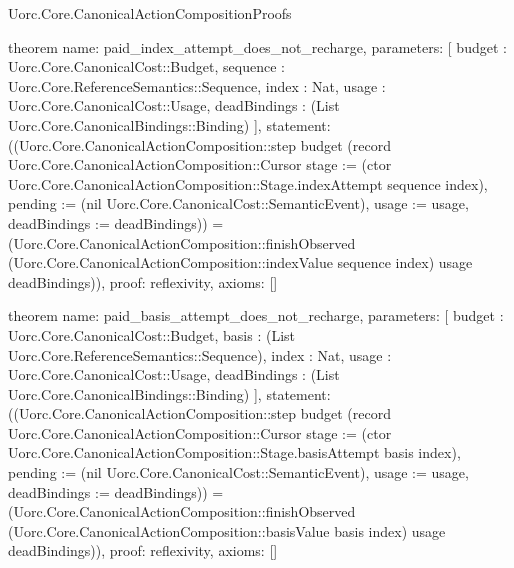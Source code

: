 \begin{lexlean}{Uorc.Core.CanonicalActionCompositionProofs}
\begin{semanticmodule}
theorem{
  name: paid_index_attempt_does_not_recharge,
  parameters: [
    budget : Uorc.Core.CanonicalCost::Budget,
    sequence : Uorc.Core.ReferenceSemantics::Sequence,
    index : Nat,
    usage : Uorc.Core.CanonicalCost::Usage,
    deadBindings : (List Uorc.Core.CanonicalBindings::Binding)
  ],
  statement: ((Uorc.Core.CanonicalActionComposition::step budget (record Uorc.Core.CanonicalActionComposition::Cursor {stage := (ctor Uorc.Core.CanonicalActionComposition::Stage.indexAttempt sequence index), pending := (nil Uorc.Core.CanonicalCost::SemanticEvent), usage := usage, deadBindings := deadBindings})) = (Uorc.Core.CanonicalActionComposition::finishObserved (Uorc.Core.CanonicalActionComposition::indexValue sequence index) usage deadBindings)),
  proof: reflexivity{},
  axioms: []
}

theorem{
  name: paid_basis_attempt_does_not_recharge,
  parameters: [
    budget : Uorc.Core.CanonicalCost::Budget,
    basis : (List Uorc.Core.ReferenceSemantics::Sequence),
    index : Nat,
    usage : Uorc.Core.CanonicalCost::Usage,
    deadBindings : (List Uorc.Core.CanonicalBindings::Binding)
  ],
  statement: ((Uorc.Core.CanonicalActionComposition::step budget (record Uorc.Core.CanonicalActionComposition::Cursor {stage := (ctor Uorc.Core.CanonicalActionComposition::Stage.basisAttempt basis index), pending := (nil Uorc.Core.CanonicalCost::SemanticEvent), usage := usage, deadBindings := deadBindings})) = (Uorc.Core.CanonicalActionComposition::finishObserved (Uorc.Core.CanonicalActionComposition::basisValue basis index) usage deadBindings)),
  proof: reflexivity{},
  axioms: []
}
\end{semanticmodule}
\end{lexlean}
